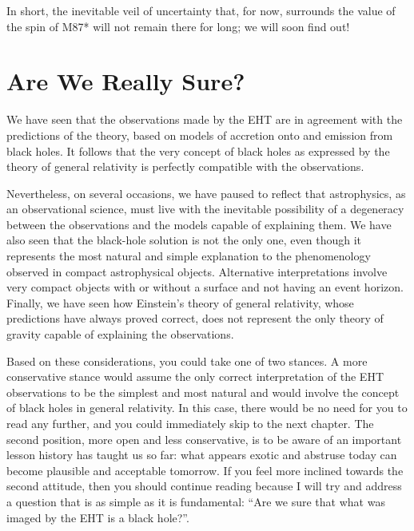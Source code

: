 In short, the inevitable veil of uncertainty that, for now, surrounds the value of the
spin of M87* will not remain there for long; we will soon find out!

\section{Are We Really Sure?}\label{sec:07-sure}

We have seen that the observations made by the EHT are in agreement with the predictions
of the theory, based on models of accretion onto and emission from black holes. It
follows that the very concept of black holes as expressed by the theory of general
relativity is perfectly compatible with the observations.

Nevertheless, on several occasions, we have paused to reflect that astrophysics, as an
observational science, must live with the
inevitable possibility of a degeneracy between the observations and
the models capable of explaining them. We have also seen that the black-hole solution is
not the only one, even though it represents the most natural and simple explanation to
the phenomenology observed in compact astrophysical objects. Alternative interpretations
involve very compact objects with or without a surface and not having an event
horizon. Finally, we have seen how Einstein's theory of general
relativity, whose predictions have always proved correct, does not represent the only
theory of gravity capable of explaining the observations.

Based on these considerations, you could take one of two stances. A more conservative
stance would assume the only correct interpretation of the EHT observations to be the
simplest and most natural and would involve the concept of black holes in general
relativity. In this case, there would be no need for you to read any
further, and you could immediately skip to the next chapter. The second position, more
open and less conservative, is to be aware of an important lesson history has taught us
so far: what appears exotic and abstruse today can become plausible and acceptable
tomorrow. If you feel more inclined towards the second attitude, then you should
continue reading because I will try and address a question that is as simple as it is
fundamental: ``Are we sure that what was imaged by the EHT is a black hole?''.

